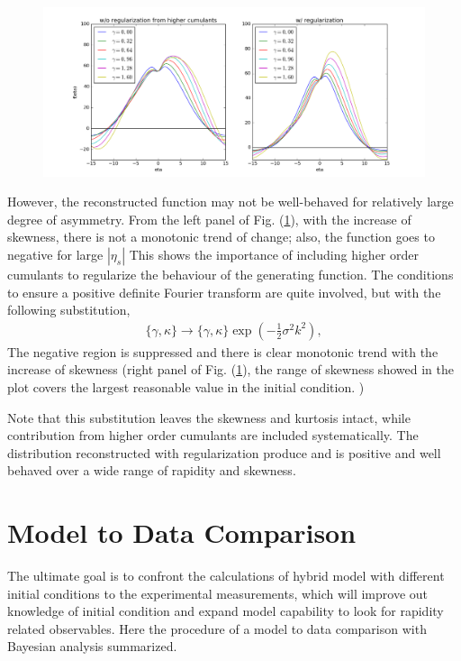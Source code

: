 \documentclass[aps,prl,twocolumn,groupedaddress]{revtex4-1}
\begin{document}
	\begin{figure}\label{regulation}
	\includegraphics[width=\columnwidth]{pics/regulate.png}
	\end{figure}
 
	However, the reconstructed function may not be well-behaved for relatively large degree of asymmetry. 
	From the left panel of Fig. (\ref{regulation}), with the increase of skewness, there is not a monotonic trend of change; also, the function goes to negative for large $|\eta_s|$
	This shows the importance of including higher order cumulants to regularize the behaviour of the generating function. 
	The conditions to ensure a positive definite Fourier transform are quite involved, but with the following substitution,
	\begin{eqnarray}
		\{\gamma, \kappa\} \rightarrow \{\gamma, \kappa\} \exp\left(-\frac{1}{2}\sigma^2k^2\right),
	\end{eqnarray}
	The negative region is suppressed and there is clear monotonic trend with the increase of skewness (right panel of Fig. (\ref{regulation}), the range of skewness showed in the plot covers the largest reasonable value in the initial condition. )
		
	Note that this substitution leaves the skewness and kurtosis intact, while contribution from higher order cumulants are included systematically.
	The distribution reconstructed with regularization produce and is positive and well behaved over a wide range of rapidity and skewness.

\section{Model to Data Comparison}
	The ultimate goal is to confront the calculations of hybrid model with different initial conditions to the experimental measurements, which will improve out knowledge of initial condition and expand model capability to look for rapidity related observables.
	Here the procedure of a model to data comparison with Bayesian analysis summarized. 
\end{document}
